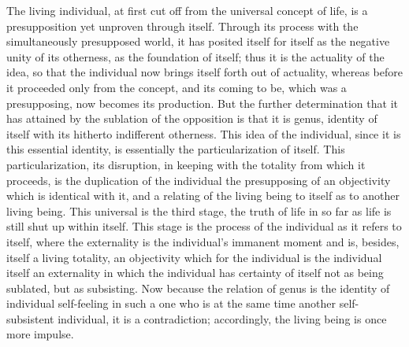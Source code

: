 The living individual, at first cut off from the universal concept of life,
is a presupposition yet unproven through itself.
Through its process with the simultaneously presupposed world,
it has posited itself for itself as the negative unity of its otherness,
as the foundation of itself;
thus it is the actuality of the idea,
so that the individual now brings itself forth out of actuality,
whereas before it proceeded only from the concept,
and its coming to be, which was a presupposing,
now becomes its production.
But the further determination that it has attained
by the sublation of the opposition is that it is genus,
identity of itself with its hitherto indifferent otherness.
This idea of the individual, since it is this essential identity,
is essentially the particularization of itself.
This particularization, its disruption,
in keeping with the totality from which it proceeds,
is the duplication of the individual
the presupposing of an objectivity
which is identical with it,
and a relating of the living being to itself
as to another living being.
This universal is the third stage, the truth of life
in so far as life is still shut up within itself.
This stage is the process of the individual as it refers to itself,
where the externality is the individual's immanent moment
and is, besides, itself a living totality,
an objectivity which for the individual is the individual itself
an externality in which the individual has certainty
of itself not as being sublated, but as subsisting.
Now because the relation of genus is the identity of individual self-feeling
in such a one who is at the same time another self-subsistent individual,
it is a contradiction; accordingly, the living being is once more impulse.

